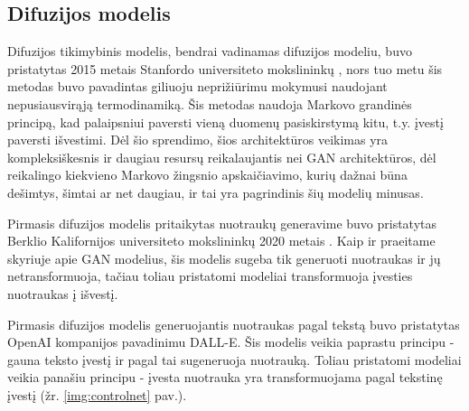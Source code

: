 \documentclass{VUMIFPSbakalaurinis}
\begin{document}
    \subsection{Difuzijos modelis}
        Difuzijos tikimybinis modelis, bendrai vadinamas difuzijos modeliu, buvo pristatytas 2015 metais Stanfordo universiteto mokslininkų \cite{DiffStart}, nors tuo metu šis metodas buvo pavadintas giliuoju neprižiūrimu mokymusi naudojant nepusiausvirąją termodinamiką. Šis metodas naudoja Markovo grandinės principą, kad palaipsniui paversti vieną duomenų pasiskirstymą kitu, t.y. įvestį paversti išvestimi. Dėl šio sprendimo, šios architektūros veikimas yra kompleksiškesnis ir daugiau resursų reikalaujantis nei GAN architektūros, dėl reikalingo kiekvieno Markovo žingsnio apskaičiavimo, kurių dažnai būna dešimtys, šimtai ar net daugiau, ir tai yra pagrindinis šių modelių minusas.

        Pirmasis difuzijos modelis pritaikytas nuotraukų generavime buvo pristatytas Berklio Kalifornijos universiteto mokslininkų 2020 metais \cite{DiffFirst}. Kaip ir praeitame skyriuje apie GAN modelius, šis modelis sugeba tik generuoti nuotraukas ir jų netransformuoja, tačiau toliau pristatomi modeliai transformuoja įvesties nuotraukas į išvestį. 
        
        Pirmasis difuzijos modelis generuojantis nuotraukas pagal tekstą buvo pristatytas OpenAI kompanijos pavadinimu DALL-E. Šis modelis veikia paprastu principu - gauna teksto įvestį ir pagal tai sugeneruoja nuotrauką. Toliau pristatomi modeliai veikia panašiu principu - įvesta nuotrauka yra transformuojama pagal tekstinę įvestį (žr. \ref{img:controlnet} pav.).
\end{document}
